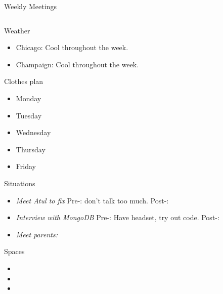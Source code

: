 \documentclass[serif, mathserif, final]{beamer}
\begin{document}
\begin{frame}
\begin{columns}
\begin{column}{0.5\linewidth}
\begin{block}{Weekly Meetings}
\begin{column}{0.25\linewidth}
      \begin{block}{Weather}
        \begin{itemize}
          \tiny \item \tiny Chicago: Cool throughout the week.
          \item \tiny Champaign: Cool throughout the week. 
        \end{itemize}
      \end{block}

      \begin{block}{Clothes plan} 
        \begin{itemize}
          \tiny \item \tiny Monday
        \item \tiny Tuesday
        \item \tiny Wednesday
        \item \tiny Thursday
        \item \tiny Friday
        \end{itemize} 
      \end{block}

      \begin{block}{Situations}
        \begin{itemize}
        \item \tiny \textit{Meet Atul to fix}
          Pre-:  don't talk too much. 
          Post-: 
        \item \tiny \textit{Interview with MongoDB} 
          Pre-: Have headset, try out code. 
          Post-: 
        \item \tiny \textit{Meet parents:} 

        \end{itemize} 
      \end{block} 

\begin{block}{Spaces}
\begin{itemize} 
\tiny \item \tiny 
\item \tiny 
\item \tiny 
\end{itemize} 
\end{block} 


\end{column}
\end{block}
\end{column}
\end{columns}
\end{frame}
\end{document}

